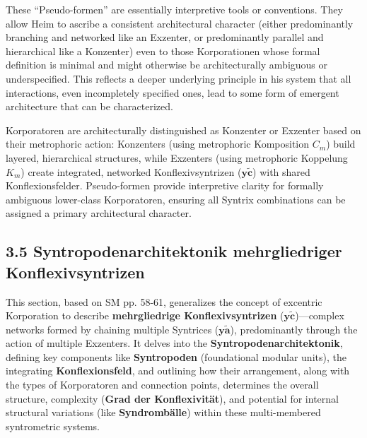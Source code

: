 \documentclass[12pt]{article}
\newcommand{\q}[1]{\enquote{#1}}
\newcommand{\syntrix}{\bm{y\widetilde{a}}}
\newcommand{\konflexivsyntrix}{\bm{y\widetilde{c}}}
\begin{document}
\begin{itemize}
\begin{itemize}
    \end{itemize}
    These \q{Pseudo-formen} are essentially interpretive tools or conventions. They allow Heim to ascribe a consistent architectural character (either predominantly branching and networked like an Exzenter, or predominantly parallel and hierarchical like a Konzenter) even to those Korporationen whose formal definition is minimal and might otherwise be architecturally ambiguous or underspecified. This reflects a deeper underlying principle in his system that all interactions, even incompletely specified ones, lead to some form of emergent architecture that can be characterized.
\end{itemize}

Korporatoren are architecturally distinguished as Konzenter or Exzenter based on their metrophoric action: Konzenters (using metrophoric Komposition \(C_m\)) build layered, hierarchical structures, while Exzenters (using metrophoric Koppelung \(K_m\)) create integrated, networked Konflexivsyntrizen (\(\konflexivsyntrix\)) with shared Konflexionsfelder. Pseudo-formen provide interpretive clarity for formally ambiguous lower-class Korporatoren, ensuring all Syntrix combinations can be assigned a primary architectural character.

\subsection{3.5 Syntropodenarchitektonik mehrgliedriger Konflexivsyntrizen}
\label{sec:syntropoden}

This section, based on SM pp. 58-61, generalizes the concept of excentric Korporation to describe \textbf{mehrgliedrige Konflexivsyntrizen} (\(\konflexivsyntrix\))—complex networks formed by chaining multiple Syntrices (\(\syntrix\)), predominantly through the action of multiple Exzenters. It delves into the \textbf{Syntropodenarchitektonik}, defining key components like \textbf{Syntropoden} (foundational modular units), the integrating \textbf{Konflexionsfeld}, and outlining how their arrangement, along with the types of Korporatoren and connection points, determines the overall structure, complexity (\textbf{Grad der Konflexivität}), and potential for internal structural variations (like \textbf{Syndrombälle}) within these multi-membered syntrometric systems.
\end{document}
